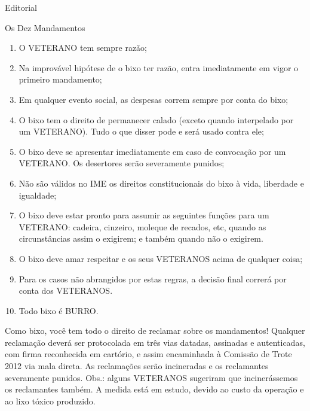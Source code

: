 \begin{secao}{Editorial}
\begin{subsecao}{Os Dez Mandamentos}
  \begin{enumerate}
  \item O VETERANO tem sempre razão;
  \item Na improvável hipótese de o bixo ter razão, entra imediatamente
        em vigor o primeiro mandamento;
  \item Em qualquer evento social, as despesas correm sempre por conta
        do bixo;
  \item O bixo tem o direito de permanecer calado (exceto quando interpelado
        por um VETERANO). Tudo o que disser pode e será usado contra ele;
  \item O bixo deve se apresentar imediatamente em caso de convocação por
        um VETERANO. Os desertores serão severamente punidos;
  \item Não são válidos no IME os direitos constitucionais do bixo à vida,
        liberdade e igualdade;
  \item O bixo deve estar pronto para assumir as seguintes funções para um
        VETERANO: cadeira, cinzeiro, moleque de recados, etc, quando as
        circunstâncias assim o exigirem; e também quando não o exigirem.
  \item O bixo deve amar respeitar e os seus VETERANOS acima de qualquer
        coisa;
  \item Para os casos não abrangidos por estas regras, a decisão final
        correrá por conta dos VETERANOS.
  \item Todo bixo é BURRO.
  \end{enumerate}

  
Como bixo, você tem todo o direito de reclamar sobre os mandamentos! Qualquer reclamação deverá ser protocolada em três vias datadas, assinadas e autenticadas, com firma reconhecida em cartório, e assim encaminhada à Comissão de Trote 2012 via mala direta. As reclamações serão incineradas e os reclamantes severamente punidos. Obs.: alguns VETERANOS sugeriram que incinerássemos os reclamantes também. A medida está em estudo, devido ao custo da operação e ao lixo tóxico produzido.


\end{subsecao}
\end{secao}
